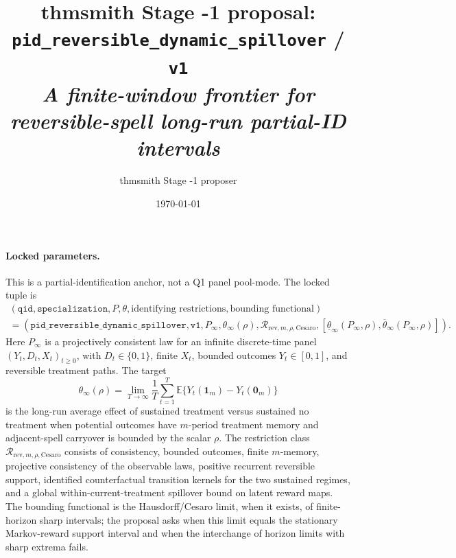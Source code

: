 \documentclass[11pt]{article}
\title{thmsmith Stage -1 proposal: \texttt{pid\_reversible\_dynamic\_spillover} / \texttt{v1}%
  \\ \large\textit{A finite-window frontier for reversible-spell long-run partial-ID intervals}}
\author{thmsmith Stage -1 proposer}
\date{\today}
\newcommand{\E}{\mathbb{E}}
\theoremstyle{definition}
\theoremstyle{plain}
\theoremstyle{remark}
\begin{document}
\maketitle


\paragraph{Locked parameters.}
This is a partial-identification anchor, not a Q1 panel pool-mode.  The locked tuple is
\[
\begin{gathered}
(\texttt{qid},\texttt{specialization},P,\theta,
  \text{identifying restrictions},\text{bounding functional})\\
=
(\texttt{pid\_reversible\_dynamic\_spillover},\texttt{v1},
  P_{\infty},\theta_{\infty}(\rho),
  \mathcal R_{\mathrm{rev},m,\rho,\mathrm{Cesaro}},
  [\underline\theta_{\infty}(P_{\infty},\rho),
    \overline\theta_{\infty}(P_{\infty},\rho)]) .
\end{gathered}
\]
Here \(P_{\infty}\) is a projectively consistent law for an infinite discrete-time panel \((Y_t,D_t,X_t)_{t\ge 0}\), with \(D_t\in\{0,1\}\), finite \(X_t\), bounded outcomes \(Y_t\in[0,1]\), and reversible treatment paths.  The target
\[
\theta_{\infty}(\rho)=
\lim_{T\to\infty}\frac1T\sum_{t=1}^{T}
\E\{Y_t(\mathbf 1_m)-Y_t(\mathbf 0_m)\}
\]
is the long-run average effect of sustained treatment versus sustained no treatment when potential outcomes have \(m\)-period treatment memory and adjacent-spell carryover is bounded by the scalar \(\rho\).  The restriction class \(\mathcal R_{\mathrm{rev},m,\rho,\mathrm{Cesaro}}\) consists of consistency, bounded outcomes, finite \(m\)-memory, projective consistency of the observable laws, positive recurrent reversible support, identified counterfactual transition kernels for the two sustained regimes, and a global within-current-treatment spillover bound on latent reward maps.  The bounding functional is the Hausdorff/Cesaro limit, when it exists, of finite-horizon sharp intervals; the proposal asks when this limit equals the stationary Markov-reward support interval and when the interchange of horizon limits with sharp extrema fails.
\end{document}

